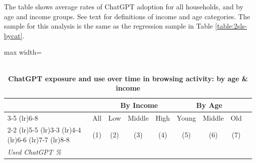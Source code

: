 \documentclass[12pt]{article}
\begin{document}
\begin{table}[htbp]
\caption{\\ \centering \textbf{ChatGPT exposure and use over time in browsing activity: by age \& income}}  


\vspace{-0.1cm} \label{tab:use_by_dem} \footnotesize  The table shows average rates of ChatGPT adoption for all households, and by age and income groups. See text for definitions of income and age categories. The sample for this analysis is the same as the regression sample in Table \ref{table:2sls-bycat}. \vspace{.2cm}
 
 \centering
\begin{adjustbox}{max width=\textwidth}
\begin{tabular}{@{}l*{8}{c}@{}}
\toprule
 & &\multicolumn{3}{c}{By Income} &  \multicolumn{3}{c}{By Age} \\
   \cmidrule(lr){3-5} \cmidrule(lr){6-8}
   \addlinespace

   & All & Low & Middle & High & Young & Middle & Old \\
      \cmidrule(lr){2-2} \cmidrule(lr){5-5}  \cmidrule(lr){3-3} \cmidrule(lr){4-4}  \cmidrule(lr){6-6}  \cmidrule(lr){7-7} \cmidrule(lr){8-8}
                                        &\multicolumn{1}{c}{(1)}   &\multicolumn{1}{c}{(2)}   &\multicolumn{1}{c}{(3)}   &\multicolumn{1}{c}{(4)}   &\multicolumn{1}{c}{(5)}   &\multicolumn{1}{c}{(6)}   &\multicolumn{1}{c}{(7)}       \\ 
                   \midrule
\addlinespace
   
 \addlinespace
\emph{Used ChatGPT \%}  &&&& \\
   
    
     
 \bottomrule
\end{tabular}
\end{adjustbox}
\end{table}
\end{document}
